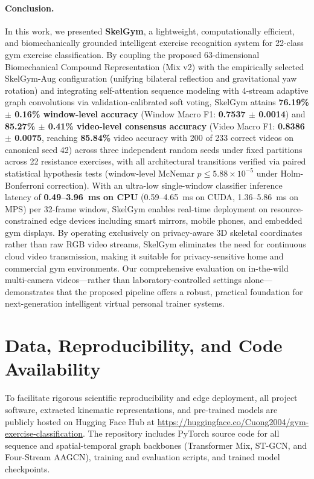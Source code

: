 \documentclass[preprint,12pt]{elsarticle}
\begin{document}
\paragraph{Conclusion.} In this work, we presented \textbf{SkelGym}, a lightweight, computationally efficient, and biomechanically grounded intelligent exercise recognition system for 22-class gym exercise classification. By coupling the proposed 63-dimensional Biomechanical Compound Representation (Mix v2) with the empirically selected SkelGym-Aug configuration (unifying bilateral reflection and gravitational yaw rotation) and integrating self-attention sequence modeling with 4-stream adaptive graph convolutions via validation-calibrated soft voting, SkelGym attains \textbf{76.19\% $\pm$ 0.16\% window-level accuracy} (Window Macro F1: \textbf{0.7537 $\pm$ 0.0014}) and \textbf{85.27\% $\pm$ 0.41\% video-level consensus accuracy} (Video Macro F1: \textbf{0.8386 $\pm$ 0.0075}, reaching \textbf{85.84\%} video accuracy with 200 of 233 correct videos on canonical seed 42) across three independent random seeds under fixed partitions across 22 resistance exercises, with all architectural transitions verified via paired statistical hypothesis tests (window-level McNemar $p \le 5.88 \times 10^{-5}$ under Holm-Bonferroni correction). With an ultra-low single-window classifier inference latency of \textbf{0.49--3.96~ms on CPU} (0.59--4.65~ms on CUDA, 1.36--5.86~ms on MPS) per 32-frame window, SkelGym enables real-time deployment on resource-constrained edge devices including smart mirrors, mobile phones, and embedded gym displays. By operating exclusively on privacy-aware 3D skeletal coordinates rather than raw RGB video streams, SkelGym eliminates the need for continuous cloud video transmission, making it suitable for privacy-sensitive home and commercial gym environments. Our comprehensive evaluation on in-the-wild multi-camera videos---rather than laboratory-controlled settings alone---demonstrates that the proposed pipeline offers a robust, practical foundation for next-generation intelligent virtual personal trainer systems.

\section*{Data, Reproducibility, and Code Availability}
To facilitate rigorous scientific reproducibility and edge deployment, all project software, extracted kinematic representations, and pre-trained models are publicly hosted on Hugging Face Hub at \url{https://huggingface.co/Cuong2004/gym-exercise-classification}. The repository includes PyTorch source code for all sequence and spatial-temporal graph backbones (Transformer Mix, ST-GCN, and Four-Stream AAGCN), training and evaluation scripts, and trained model checkpoints. 
\end{document}
